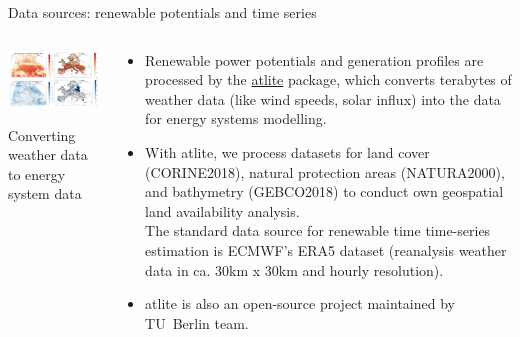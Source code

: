 \begin{frame}{Data sources: renewable potentials and time series}
 
  \begin{columns}[T]
  \begin{column}{8cm}

  \vspace{0.5cm}
  \centering

  \includegraphics[width=8cm]{images/atlite.jpg}

  {\footnotesize 
  Converting weather data to energy system data
  }
  \end{column}

  \begin{column}{8cm}
  \vspace{-0.2cm}
  {\small 
  \begin{itemize}
    \item Renewable power potentials and generation profiles are processed by 
    the \href{https://github.com/PyPSA/atlite}{\alert{atlite}} package, 
    which converts terabytes of weather data (like wind speeds, solar influx) 
    into the data for energy systems modelling.
    \item With atlite, we process datasets for land cover (CORINE2018), natural protection areas (NATURA2000), and bathymetry (GEBCO2018) to conduct own geospatial land availability analysis.\\The standard data source for renewable time time-series estimation is ECMWF's ERA5 dataset (reanalysis weather data in ca. 30km x 30km and hourly resolution). 
    \item  atlite is also an open-source project maintained by TU~Berlin team. \\
    \faGithub~ \\
    \faBook~

  \end{itemize}
  }
  \end{column}
  \end{columns}

\end{frame}




